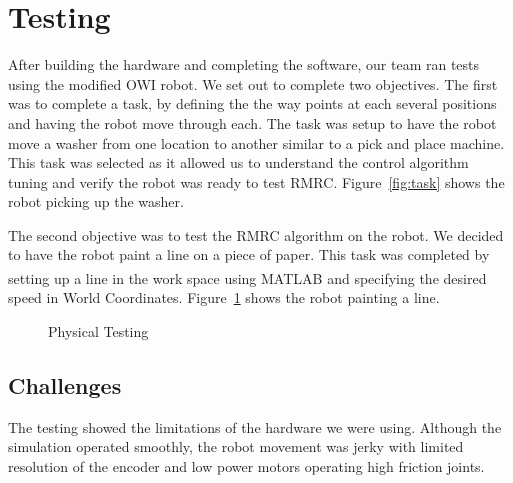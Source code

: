 \documentclass[paper=letter, fontsize=10pt]{scrartcl}	%
\numberwithin{equation}{section}															%
\numberwithin{figure}{section}																%
\numberwithin{table}{section}																%
\begin{document}
\section{Testing}

After building the hardware and completing the software, our team ran tests using the modified OWI robot. We set out to complete two objectives. The first was to complete a task, by defining the the way points at each several positions and having the robot move through each. The task was setup to have the robot move a washer from one location to another similar to a pick and place machine. This task was selected as it allowed us to understand the control algorithm tuning and verify the robot was ready to test RMRC. Figure~\ref{fig:task} shows the robot picking up the washer.

The second objective was to test the RMRC algorithm on the robot. We decided to have the robot paint a line on a piece of paper. This task was completed by setting up a line in the work space using MATLAB\textsuperscript{\textregistered} and specifying the desired speed in World Coordinates. Figure~\ref{fig:Testing} shows the robot painting a line. 


\begin{figure}[!h]
  \centering
   \quad
    \caption{Physical Testing}
    \label{fig:Testing}
\end{figure}

\subsection{Challenges}
The testing showed the limitations of the hardware we were using. Although the simulation operated smoothly, the robot movement was jerky with limited resolution of the encoder and low power motors operating high friction joints.
\end{document}
